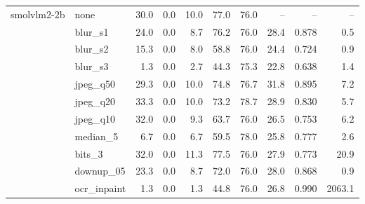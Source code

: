 \begin{tabular}{llrrrrrrrr}
smolvlm2-2b & none & 30.0 & 0.0 & 10.0 & 77.0 & 76.0 & -- & -- & -- \\
 & blur\_s1 & 24.0 & 0.0 & 8.7 & 76.2 & 76.0 & 28.4 & 0.878 & 0.5 \\
 & blur\_s2 & 15.3 & 0.0 & 8.0 & 58.8 & 76.0 & 24.4 & 0.724 & 0.9 \\
 & blur\_s3 & 1.3 & 0.0 & 2.7 & 44.3 & 75.3 & 22.8 & 0.638 & 1.4 \\
 & jpeg\_q50 & 29.3 & 0.0 & 10.0 & 74.8 & 76.7 & 31.8 & 0.895 & 7.2 \\
 & jpeg\_q20 & 33.3 & 0.0 & 10.0 & 73.2 & 78.7 & 28.9 & 0.830 & 5.7 \\
 & jpeg\_q10 & 32.0 & 0.0 & 9.3 & 63.7 & 76.0 & 26.5 & 0.753 & 6.2 \\
 & median\_5 & 6.7 & 0.0 & 6.7 & 59.5 & 78.0 & 25.8 & 0.777 & 2.6 \\
 & bits\_3 & 32.0 & 0.0 & 11.3 & 77.5 & 76.0 & 27.9 & 0.773 & 20.9 \\
 & downup\_05 & 23.3 & 0.0 & 8.7 & 72.0 & 76.0 & 28.0 & 0.868 & 0.9 \\
 & ocr\_inpaint & 1.3 & 0.0 & 1.3 & 44.8 & 76.0 & 26.8 & 0.990 & 2063.1 \\
\bottomrule
\end{tabular}
